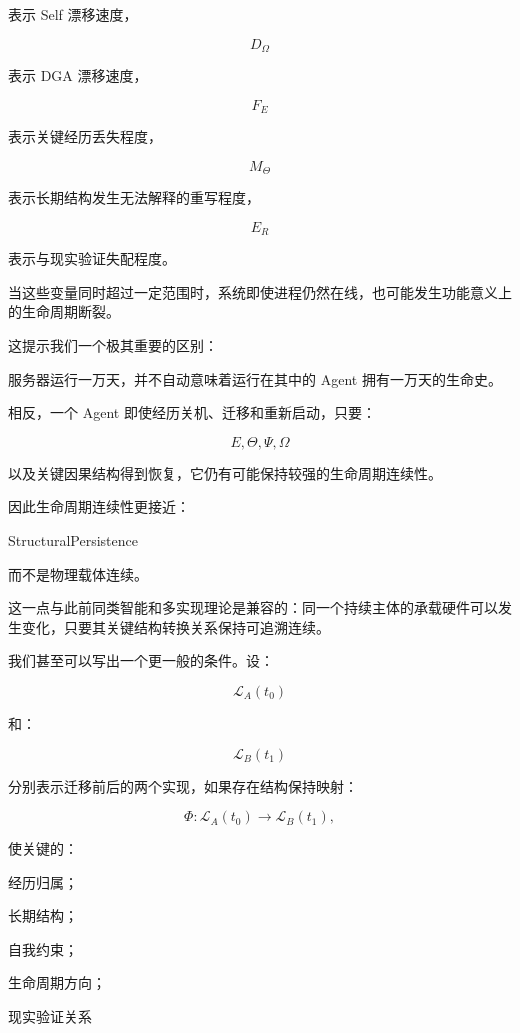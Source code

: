 表示 Self 漂移速度，

\[
D_\Omega
\]

表示 DGA 漂移速度，

\[
F_E
\]

表示关键经历丢失程度，

\[
M_\Theta
\]

表示长期结构发生无法解释的重写程度，

\[
E_R
\]

表示与现实验证失配程度。

当这些变量同时超过一定范围时，系统即使进程仍然在线，也可能发生功能意义上的生命周期断裂。

这提示我们一个极其重要的区别：

\begin{statementbox}
\centering
{}
\end{statementbox}

服务器运行一万天，并不自动意味着运行在其中的 Agent 拥有一万天的生命史。

相反，一个 Agent 即使经历关机、迁移和重新启动，只要：

\[
E,\Theta,\Psi,\Omega
\]

以及关键因果结构得到恢复，它仍有可能保持较强的生命周期连续性。

因此生命周期连续性更接近：

\begin{statementbox}
StructuralPersistence
\end{statementbox}

而不是物理载体连续。

这一点与此前同类智能和多实现理论是兼容的：同一个持续主体的承载硬件可以发生变化，只要其关键结构转换关系保持可追溯连续。

我们甚至可以写出一个更一般的条件。设：

\[
\mathcal{L}_A(t_0)
\]

和：

\[
\mathcal{L}_B(t_1)
\]

分别表示迁移前后的两个实现，如果存在结构保持映射：

\[
\Phi:
\mathcal{L}_A(t_0)
\rightarrow
\mathcal{L}_B(t_1),
\]

使关键的：

经历归属；

长期结构；

自我约束；

生命周期方向；

现实验证关系

